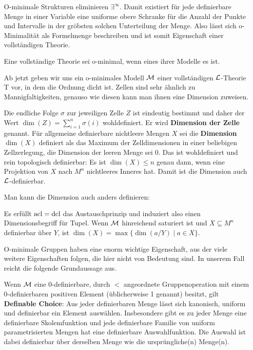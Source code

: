 \begin{corollary}
	O-minimale Strukturen eliminieren $\exists^\infty$. Damit existiert für jede definierbare Menge in einer Variable eine uniforme obere Schranke für die Anzahl der Punkte und Intervalle in der gröbsten solchen Unterteilung der Menge. Also lässt sich o-Minimalität als Formelmenge beschreiben und ist somit Eigenschaft einer vollständigen Theorie.
\end{corollary}

\begin{definition}
	Eine vollständige Theorie sei o-minimal, wenn eines ihrer Modelle es ist.
\end{definition}
\newpage
Ab jetzt geben wir uns ein o-minimales Modell $\mathcal{M}$ einer vollständigen $\mathcal{L}$-Theorie T vor, in dem die Ordnung dicht ist. Zellen sind sehr ähnlich zu Mannigfaltigkeiten, genauso wie diesen kann man ihnen eine Dimension zuweisen.
\begin{factdef}
	Die endliche Folge $\sigma$ zur jeweiligen Zelle $Z$ ist eindeutig bestimmt und daher der Wert $\dim(Z)=\sum\limits_{i=1}^n\sigma(i)$ wohldefiniert. Er wird \textbf{Dimension der Zelle} genannt. Für allgemeine definierbare nichtleere Mengen $X$ sei die \textbf{Dimension} $\dim(X)$ definiert als das Maximum der Zelldimensionen in einer beliebigen Zellzerlegung, die Dimension der leeren Menge sei 0. Das ist wohldefiniert und rein topologisch definierbar: Es ist $\dim(X)\leq n$ genau dann, wenn eine Projektion von $X$ nach $M^n$ nichtleeres Inneres hat. Damit ist die Dimension auch $\mathcal{L}$-definierbar.
\end{factdef}

Man kann die Dimension auch anders definieren:
\begin{fact}
	Es erfüllt $\operatorname{acl}=\operatorname{dcl}$ das Austauschprinzip und induziert also einen Dimensionsbegriff für Tupel. Wenn $\mathcal{M}$ hinreichend saturiert ist und $X\subseteq M^n$ definierbar über $Y$, ist $\dim(X)=\max\{\dim(a/Y)\mid a\in X\}$.
\end{fact}

O-minimale Gruppen haben eine enorm wichtige Eigenschaft, aus der viele weitere Eigenschaften folgen, die hier nicht von Bedeutung sind. In unserem Fall reicht die folgende Grundaussage aus.
\begin{fact}
	Wenn $\mathcal{M}$ eine 0-definierbare, durch $<$ angeordnete Gruppenoperation mit einem 0-definierbaren positiven Element (üblicherweise 1 genannt) besitzt, gilt \textbf{Definable Choice}: Aus jeder definierbaren Menge lässt sich kanonisch, uniform und definierbar ein Element auswählen. Insbesondere gibt es zu jeder Menge eine definierbare Skolemfunktion und jede definierbare Familie von uniform parametrisierten Mengen hat eine definierbare Auswahlfunktion. Die Auswahl ist dabei definierbar über derselben Menge wie die ursprüngliche(n) Menge(n).
\end{fact}


